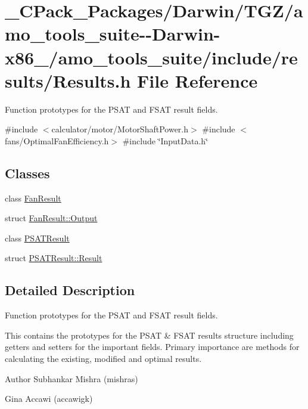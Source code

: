 \hypertarget{___c_pack___packages_2_darwin_2_t_g_z_2amo__tools__suite--_darwin-x86__64_2amo__tools__suite_2include_2results_2_results_8h}{}\section{\+\_\+\+C\+Pack\+\_\+\+Packages/\+Darwin/\+T\+G\+Z/amo\+\_\+tools\+\_\+suite-\/-\/\+Darwin-\/x86\+\_/amo\+\_\+tools\+\_\+suite/include/results/\+Results.h File Reference}
\label{___c_pack___packages_2_darwin_2_t_g_z_2amo__tools__suite--_darwin-x86__64_2amo__tools__suite_2include_2results_2_results_8h}


Function prototypes for the P\+S\+AT and F\+S\+AT result fields.  


{\ttfamily \#include $<$calculator/motor/\+Motor\+Shaft\+Power.\+h$>$}\newline
{\ttfamily \#include $<$fans/\+Optimal\+Fan\+Efficiency.\+h$>$}\newline
{\ttfamily \#include \char`\"{}Input\+Data.\+h\char`\"{}}\newline
\subsection*{Classes}
\begin{DoxyCompactItemize}
\item 
class \hyperlink{class_fan_result}{Fan\+Result}
\item 
struct \hyperlink{struct_fan_result_1_1_output}{Fan\+Result\+::\+Output}
\item 
class \hyperlink{class_p_s_a_t_result}{P\+S\+A\+T\+Result}
\item 
struct \hyperlink{struct_p_s_a_t_result_1_1_result}{P\+S\+A\+T\+Result\+::\+Result}
\end{DoxyCompactItemize}


\subsection{Detailed Description}
Function prototypes for the P\+S\+AT and F\+S\+AT result fields. 

This contains the prototypes for the P\+S\+AT \& F\+S\+AT results structure including getters and setters for the important fields. Primary importance are methods for calculating the existing, modified and optimal results.

\begin{DoxyAuthor}{Author}
Subhankar Mishra (mishras) 

Gina Accawi (accawigk) 
\end{DoxyAuthor}
